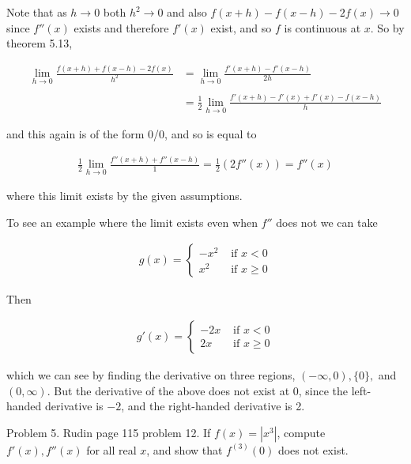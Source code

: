 \documentclass{article}
\begin{document}
  Note that as $h\to 0$ both $h^2\to 0$ and also $f(x+h)-f(x-h)-2f(x)\to 0$ since $f''(x)$ exists and therefore $f'(x)$ exist, and so $f$ is continuous at $x$.  So by theorem 5.13,

  \begin{align*}
    \lim_{h\to 0}\frac{f(x+h)+f(x-h)-2f(x)}{h^2} &= \lim_{h\to 0}\frac{f'(x+h)-f'(x-h)}{2h} \\\\
    &= \frac 1 2 \lim_{h\to 0} \frac{f'(x+h)-f'(x)+f'(x)-f(x-h)}{h}
  \end{align*}

  and this again is of the form 0/0, and so is equal to

  \begin{align*}
    \frac 1 2 \lim_{h\to 0}\frac{f''(x+h)+f''(x-h)}{1} = \frac 1 2 (2f''(x)) = f''(x)
  \end{align*}

  where this limit exists by the given assumptions.

  \vspace{1cm}

  To see an example where the limit exists even when $f''$ does not we can take

  \begin{align*}
    g(x) = \begin{cases}
      -x^2 & \text{ if } x < 0\\
      x^2 & \text{ if } x\geq 0
    \end{cases}
  \end{align*}

  Then

  \begin{align*}
    g'(x) = \begin{cases}
      -2x & \text{ if } x < 0\\
      2x & \text{ if } x\geq 0
    \end{cases}
  \end{align*}

  which we can see by finding the derivative on three regions, $(-\infty, 0), \{0\},$ and $(0,\infty)$.  But the derivative of the above does not exist at 0, since the left-handed derivative is $-2$, and the right-handed derivative is 2.

  \pagebreak

  {\Large \color{Sepia} Problem 5. Rudin page 115 problem 12. If $f(x)=|x^3|$, compute $f'(x), f''(x)$ for all real $x$, and show that $f^{(3)}(0)$ does not exist.}
\end{document}
